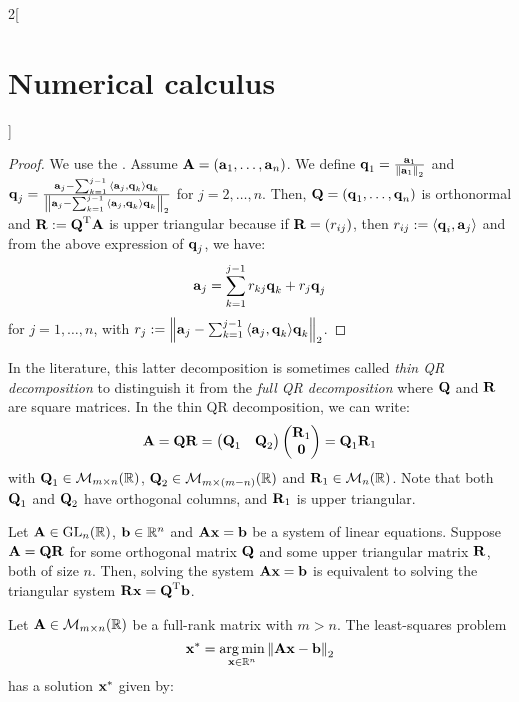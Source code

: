 \documentclass[../../../main_math.tex]{subfiles}
\begin{document}
\begin{multicols}{2}[\section{Numerical calculus}]
\begin{proposition}
  \end{proposition}
  \begin{proof}
    We use the . Assume $\vf{A}=(\vf{a}_1,\ldots,\vf{a}_n)$. We define $\vf{q}_1=\frac{\vf{a}_1}{\norm{\vf{a}_1}_2}$ and $\vf{q}_j=\frac{\vf{a}_j-\sum_{k=1}^{j-1}\dotp{\vf{a}_j}{\vf{q}_k}\vf{q}_k}{\norm{\vf{a}_j-\sum_{k=1}^{j-1}\dotp{\vf{a}_j}{\vf{q}_k}\vf{q}_k}_2}$ for $j=2,\ldots,n$. Then, $\vf{Q}=(\vf{q}_1,\ldots,\vf{q}_n)$ is orthonormal and $\vf{R}:=\transpose{\vf{Q}}\vf{A}$ is upper triangular because if $\vf{R}=(r_{ij})$, then $r_{ij}:=\dotp{\vf{q}_i}{\vf{a}_j}$ and from the above expression of $\vf{q}_j$, we have:
    $$
      \vf{a}_j=\sum_{k=1}^{j-1} r_{kj}\vf{q}_k + r_j \vf{q}_j
    $$
    for $j=1,\ldots,n$, with $r_j:=\norm{\vf{a}_j-\sum_{k=1}^{j-1}\dotp{\vf{a}_j}{\vf{q}_k}\vf{q}_k}_2$.
  \end{proof}
  \begin{remark}
    In the literature, this latter decomposition is sometimes called \emph{thin QR decomposition} to distinguish it from the \emph{full QR decomposition} where $\vf{Q}$ and $\vf{R}$ are square matrices. In the thin QR decomposition, we can write:
    $$
      \vf{A}=\vf{Q}\vf{R}=\begin{pmatrix}
        \vf{Q}_1 & \vf{Q}_2
      \end{pmatrix}\begin{pmatrix}
        \vf{R}_1 \\
        \vf{0}
      \end{pmatrix}=\vf{Q}_1\vf{R}_1
    $$
    with $\vf{Q}_1\in\mathcal{M}_{m\times n}(\RR)$, $\vf{Q}_2\in\mathcal{M}_{m\times (m-n)}(\RR)$ and $\vf{R}_1\in\mathcal{M}_{n}(\RR)$. Note that both $\vf{Q}_1$ and $\vf{Q}_2$ have orthogonal columns, and $\vf{R}_1$ is upper triangular.
  \end{remark}
  \begin{lemma}
    Let $\vf{A}\in\GL_n(\RR)$, $\vf{b}\in\RR^n$ and $\vf{A}\vf{x}=\vf{b}$ be a system of linear equations. Suppose $\vf{A}=\vf{Q}\vf{R}$ for some orthogonal matrix $\vf{Q}$ and some upper triangular matrix $\vf{R}$, both of size $n$. Then, solving the system $\vf{A}\vf{x}=\vf{b}$ is equivalent to solving the triangular system $\vf{R}\vf{x}=\transpose{\vf{Q}}\vf{b}$.
  \end{lemma}
  \begin{proposition}
    Let $\vf{A}\in\mathcal{M}_{m\times n}(\RR)$ be a full-rank matrix with $m>n$. The least-squares problem
    $$\vf{x}^*=\argmin_{\vf{x}\in\RR^n}\norm{\vf{A}\vf{x}-\vf{b}}_2$$ has a solution $\vf{x}^*$ given by:

\end{proposition}
\end{multicols}
\end{document}
